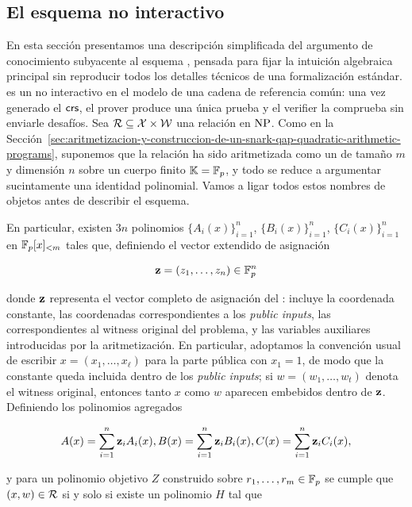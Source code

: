 
\subsection{El esquema no interactivo \Groth}
\label{subsec:apendice-b-groth16-esquema-no-interactivo-groth}

En esta sección presentamos una descripción simplificada del argumento de conocimiento subyacente al esquema \Groth, pensada para fijar la intuición algebraica principal sin reproducir todos los detalles técnicos de una formalización estándar. \Groth es un \zkSNARK no interactivo en el modelo de una cadena de referencia común: una vez generado el $\mathsf{crs}$, el prover produce una única prueba y el verifier la comprueba sin enviarle desafíos. Sea $\mathcal{R} \subseteq \mathcal{X} \times \mathcal{W}$ una relación en $\mathrm{NP}$. Como en la Sección~\ref{sec:aritmetizacion-y-construccion-de-un-snark-qap-quadratic-arithmetic-programs}, suponemos que la relación ha sido aritmetizada como un \QAP de tamaño $m$ y dimensión $n$ sobre un cuerpo finito $\mathbb{K} = \mathbb{F}_p$, y todo se reduce a argumentar sucintamente una identidad polinomial. Vamos a ligar todos estos nombres de objetos antes de describir el esquema.

En particular, existen $3n$ polinomios $\{A_i(x)\}_{i=1}^n$, $\{B_i(x)\}_{i=1}^n$, $\{C_i(x)\}_{i=1}^n$ en $\mathbb{F}_p[x]_{< m}$ tales que, definiendo el vector extendido de asignación

$$\mathbf{z} = (z_1, \ldots, z_n) \in \mathbb{F}_p^n$$

donde $\mathbf{z}$ representa el vector completo de asignación del \QAP: incluye la coordenada constante, las coordenadas correspondientes a los \textit{public inputs}, las correspondientes al witness original del problema, y las variables auxiliares introducidas por la aritmetización. En particular, adoptamos la convención usual de escribir $x = (x_1, \ldots, x_\ell)$ para la parte pública con $x_1 = 1$, de modo que la constante queda incluida dentro de los \textit{public inputs}; si $w = (w_1, \ldots, w_t)$ denota el witness original, entonces tanto $x$ como $w$ aparecen embebidos dentro de $\mathbf{z}$. Definiendo los polinomios agregados

$$A(x) = \sum_{i=1}^n \mathbf{z}_i A_i(x), B(x) = \sum_{i=1}^n \mathbf{z}_i B_i(x), C(x) = \sum_{i=1}^n \mathbf{z}_i C_i(x),$$

y para un polinomio objetivo $Z$ construido sobre $r_1, \ldots, r_m \in \mathbb{F}_p$ se cumple que $(x, w) \in \mathcal{R}$ si y solo si existe un polinomio $H$ tal que

